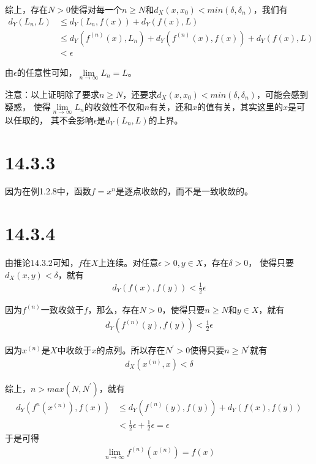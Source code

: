 \documentclass{article}
\begin{document}
综上，存在$N > 0$使得对每一个$n \geq N$和$d_X(x, x_0) < min(\delta, \delta_n)$，我们有
\begin{align*}
  d_Y(L_n, L) & \leq d_Y(L_n, f(x)) + d_Y(f(x), L)                                \\
              & \leq d_Y(f^{(n)}(x), L_n) + d_Y(f^{(n)}(x), f(x)) +  d_Y(f(x), L) \\
              & < \epsilon
\end{align*}

由$\epsilon$的任意性可知，$\lim\limits_{n \to \infty} L_n = L$。

注意：以上证明除了要求$n \geq N$，还要求$d_X(x, x_0) < min(\delta, \delta_n)$，可能会感到疑惑，
使得$\lim\limits_{n \to \infty} L_n$的收敛性不仅和$n$有关，还和$x$的值有关，其实这里的$x$是可以任取的，
其不会影响$\epsilon$是$d_Y(L_n, L)$的上界。

\section*{14.3.3}

因为在例1.2.8中，函数$f = x^n$是逐点收敛的，而不是一致收敛的。

\section*{14.3.4}

由推论$14.3.2$可知，$f$在$X$上连续。对任意$\epsilon > 0, y \in X$，存在$\delta > 0$，
使得只要$d_X(x, y) < \delta$，就有
\begin{align*}
  d_Y(f(x), f(y)) < \frac{1}{2} \epsilon
\end{align*}

因为$f^{(n)}$一致收敛于$f$，那么，存在$N > 0$，使得只要$n \geq N$和$y \in X$，就有
\begin{align*}
  d_Y(f^{(n)}(y), f(y)) < \frac{1}{2} \epsilon
\end{align*}

因为$x^{(n)}$是$X$中收敛于$x$的点列。所以存在$N^\prime > 0$使得只要$n \geq N^\prime$就有
\begin{align*}
  d_X(x^{(n)}, x) < \delta
\end{align*}

综上，$n > max(N, N^\prime)$，就有
\begin{align*}
  d_Y(f^{n}(x^{(n)}), f(x)) & \leq d_Y(f^{(n)}(y), f(y)) + d_Y(f(x), f(y))             \\
                            & < \frac{1}{2} \epsilon + \frac{1}{2} \epsilon = \epsilon
\end{align*}
于是可得
\begin{align*}
  \lim\limits_{n \to \infty} f^{(n)}(x^{(n)}) = f(x)
\end{align*}
\end{document}
